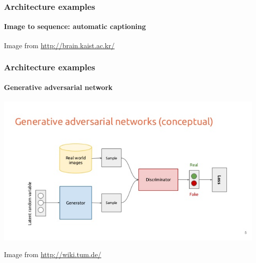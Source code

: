 \documentclass[9pt]{beamer}
\begin{document}
\begin{frame}
  \frametitle{Architecture examples}

  \framesubtitle{Image to sequence: automatic captioning}

  \begin{center}
  \end{center}

  {\small Image from \url{http://brain.kaist.ac.kr/}}
\end{frame}

\begin{frame}
  \frametitle{Architecture examples}

  \framesubtitle{Generative adversarial network}

  \begin{center}
    \includegraphics[width=\linewidth]{images/GAN_1.jpg}
  \end{center}

  {\small Image from \url{http://wiki.tum.de/}}
\end{frame}
\end{document}
